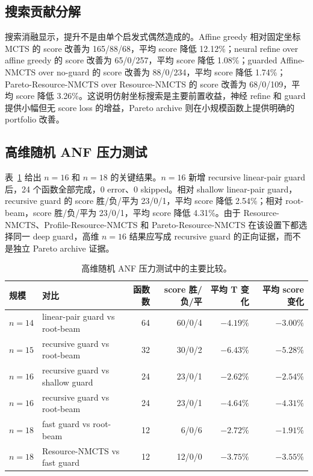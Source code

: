 \documentclass[UTF8,fontset=macnew,11pt]{ctexart}
\newcommand{\method}{Resource-NMCTS}
\newcommand{\pareto}{Pareto-Resource-NMCTS}
\begin{document}
\subsection{搜索贡献分解}

搜索消融显示，提升不是由单个启发式偶然造成的。Affine greedy 相对固定坐标 MCTS 的 score 改善为 165/88/68，平均 score 降低 12.12\%；neural refine over affine greedy 的 score 改善为 65/0/257，平均 score 降低 1.08\%；guarded Affine-NMCTS over no-guard 的 score 改善为 88/0/234，平均 score 降低 1.74\%；\pareto{} over \method{} 的 score 改善为 68/0/109，平均 score 降低 3.26\%。这说明仿射坐标搜索是主要前置收益，神经 refine 和 guard 提供小幅但无 score loss 的增益，Pareto archive 则在小规模函数上提供明确的 portfolio 改善。

\subsection{高维随机 ANF 压力测试}

表~\ref{tab:highdim} 给出 $n=16$ 和 $n=18$ 的关键结果。$n=16$ 新增 recursive linear-pair guard 后，24 个函数全部完成，0 error、0 skipped。相对 shallow linear-pair guard，recursive guard 的 score 胜/负/平为 23/0/1，平均 score 降低 2.54\%；相对 root-beam，score 胜/负/平为 23/0/1，平均 score 降低 4.31\%。由于 \method{}、Profile-\method{} 和 \pareto{} 在该设置下都选择同一 deep guard，高维 $n=16$ 结果应写成 recursive guard 的正向证据，而不是独立 Pareto archive 证据。

\begin{table}[t]
\centering
\small
\caption{高维随机 ANF 压力测试中的主要比较。}
\label{tab:highdim}
\begin{tabular}{llrrrr}
\toprule
规模 & 对比 & 函数数 & score 胜/负/平 & 平均 T 变化 & 平均 score 变化 \\
\midrule
$n=14$ & linear-pair guard vs root-beam & 64 & 60/0/4 & $-4.19\%$ & $-3.00\%$ \\
$n=15$ & recursive guard vs root-beam & 32 & 30/0/2 & $-6.43\%$ & $-5.28\%$ \\
$n=16$ & recursive guard vs shallow guard & 24 & 23/0/1 & $-2.62\%$ & $-2.54\%$ \\
$n=16$ & recursive guard vs root-beam & 24 & 23/0/1 & $-4.64\%$ & $-4.31\%$ \\
$n=18$ & fast guard vs root-beam & 12 & 6/0/6 & $-2.72\%$ & $-1.91\%$ \\
$n=18$ & \method{} vs fast guard & 12 & 12/0/0 & $-3.75\%$ & $-3.55\%$ \\
\bottomrule
\end{tabular}
\end{table}
\end{document}

